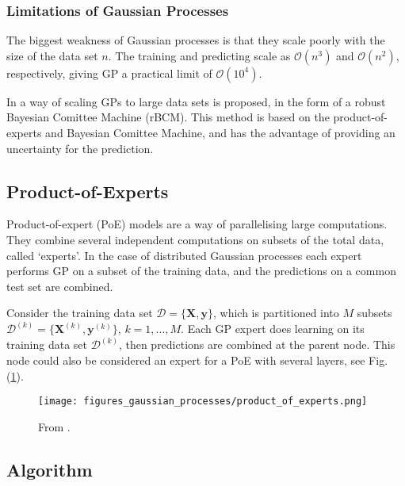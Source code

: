 \documentclass[twoside,english]{uiofysmaster}
\begin{document}
\subsubsection{Limitations of Gaussian Processes}

The biggest weakness of Gaussian processes is that they scale poorly with the size of the data set $n$. The training and predicting scale as $\mathcal{O}(n^3)$ and $\mathcal{O}(n^2)$, respectively, giving GP a practical limit of $\mathcal{O}(10^4)$.

In \cite{deisenroth2015distributed} a way of scaling GPs to large data sets is proposed, in the form of a robust Bayesian Comittee Machine (rBCM). This method is based on the product-of-experts and Bayesian Comittee Machine, and has the advantage of providing an uncertainty for the prediction.


\subsection{Product-of-Experts}

Product-of-expert (PoE) models are a way of parallelising large computations. They combine several independent computations on subsets of the total data, called `experts'. In the case of distributed Gaussian processes each expert performs GP on a subset of the training data, and the predictions on a common test set are combined.

Consider the training data set $\mathcal{D} = \{ \textbf{X}, \textbf{y}\}$, which is partitioned into $M$ subsets $\mathcal{D}^{(k)} = \{\textbf{X}^{(k)}, \textbf{y}^{(k)} \}$, $k = 1,...,M$. Each GP expert does learning on its training data set $\mathcal{D}^{(k)}$, then predictions are combined at the parent node. This node could also be considered an expert for a PoE with several layers, see Fig. (\ref{Fig:: gaussian process : DGP illustration of layers}). 

\begin{figure}
\centering
\texttt{[image: figures\_gaussian\_processes/product\_of\_experts.png]}
\caption{From \cite{deisenroth2015distributed}.}
\label{Fig:: gaussian process : DGP illustration of layers}
\end{figure}

\subsection{Algorithm}
\end{document}
